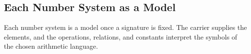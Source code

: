 \subsection*{Each Number System as a Model}
\label{subsec:each-number-system-as-a-model}

\begin{remark*}[Exposition]
Each number system is a model once a signature is fixed.  The carrier supplies
the elements, and the operations, relations, and constants interpret the
symbols of the chosen arithmetic language.
\end{remark*}
